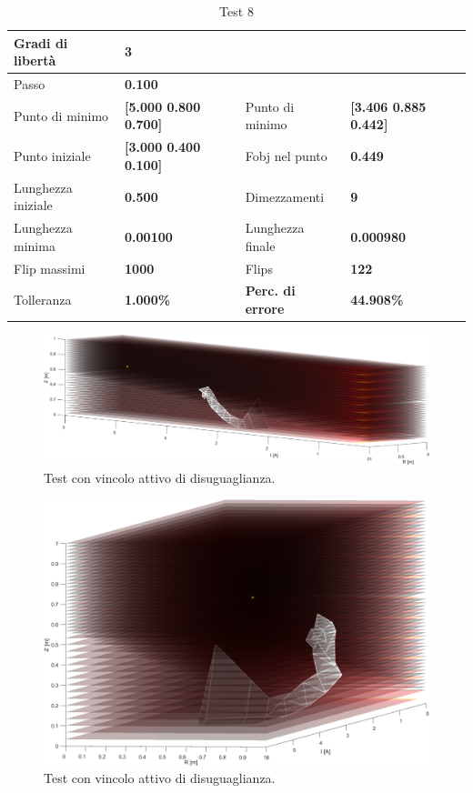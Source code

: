 \documentclass[a4paper, 11pt]{article}
\begin{document}
\begin{table}[h]
	\caption{Test 8}
	\begin{center}
	\begin{tabular}{|l|l|l|l|} 
	\hline 
	Gradi di libertà & \textbf{3} &  &  \\ \hline 
	Passo & \textbf{0.100} &  &  \\ \hline 
	Punto di minimo & \textbf{{[}5.000 0.800 0.700{]}} & Punto di minimo & \textbf{{[}3.406 0.885 0.442{]}} \\ \hline 
	Punto iniziale & \textbf{{[}3.000 0.400 0.100{]}} & Fobj nel punto & \textbf{0.449} \\ \hline 
	Lunghezza iniziale & \textbf{0.500} & Dimezzamenti & \textbf{9} \\ \hline 
	Lunghezza minima & \textbf{0.00100} & Lunghezza finale & \textbf{0.000980} \\ \hline
	Flip massimi & \textbf{1000} & Flips & \textbf{122} \\ \hline 
	Tolleranza & \textbf{1.000\%} & \textbf{Perc. di errore} & \textbf{44.908\%} \\ \hline 
	\end{tabular}
	\end{center}
	\end{table}

\begin{figure}[H]
	\centering
		\includegraphics[width=16cm]{assets/figure8}
		\caption{Test con vincolo attivo di disuguaglianza.}
\end{figure}
\noindent

\begin{figure}[H]
	\centering
		\includegraphics[width=13cm]{assets/figure9}
		\caption{Test con vincolo attivo di disuguaglianza.}
\end{figure}
\end{document}

